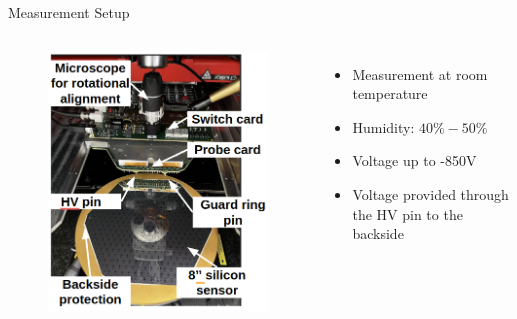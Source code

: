 \documentclass{beamer}
\begin{document}
\begin{frame}{Measurement Setup}
  \begin{columns}
      \begin{figure}
          \includegraphics[width=.9\textwidth]{plots/PM8_description.png}
      \end{figure}

        \begin{itemize}
            \item Measurement at room temperature
            \item Humidity: $ 40\% - 50\%$
            \item Voltage up to \alert{-850V}
            \item Voltage provided through the HV pin to the backside
        \end{itemize}
  \end{columns}
\end{frame}
\end{document}
